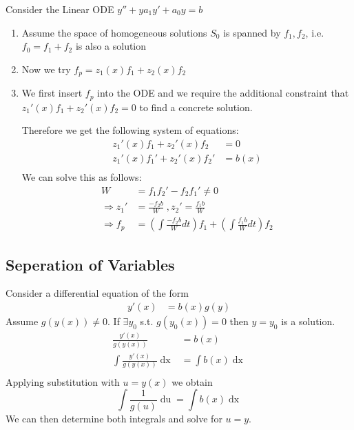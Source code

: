 \documentclass[a4paper,fontsize = 8pt]{scrartcl}
\begin{document}
Consider the Linear ODE $y'' + y a_1y' + a_0y = b$
\begin{enumerate}[label=(\arabic*)]
  \item Assume the space of homogeneous solutions $S_0$ is spanned by $f_1, f_2$, i.e. $f_0 = f_1 + f_2$ is also a solution  
  \item Now we try \(f_p = z_1(x) f_1 + z_2(x) f_2\)
  \item We first insert $f_p$ into the ODE and we require the additional constraint that $ z_1'(x) f_1 + z_2'(x) f_2 = 0$ to find a concrete solution. 
  
  Therefore we get the following system of equations:
  \begin{align*}
    z_1'(x) f_1 + z_2'(x) f_2 &= 0\\
    z_1'(x) f_1' + z_2'(x) f_2' &= b(x)\\
  \end{align*}
  We can solve this as follows:
  \begin{align*}
    W &= f_1 f_2' - f_2 f_1' \neq 0\\
    \Rightarrow z_1' &= \frac{-f_2 b}{W} \; , z_2' = \frac{f_1 b}{W}\\
    \Rightarrow f_p &= \left(\int \frac{-f_2 b}{W} dt\right)f_1  + \left(\int \frac{f_1 b}{W} dt\right)f_2 
  \end{align*}
\end{enumerate}

\subsection{Seperation of Variables}
    Consider a differential equation of the form 
    \begin{align*}
        y'(x) &= b(x)g(y)
    \end{align*}
    Assume $g(y(x)) \neq 0$. If $\exists y_0$ s.t. $g(y_0(x)) = 0$ then $y = y_0$ is a solution.
    \begin{align*}
        \frac{y'(x)}{g(y(x))} &= b(x)\\
        \int \frac{y'(x)}{g(y(x))} \mathop{dx} &= \int b(x) \mathop{dx}\\
    \end{align*}
    Applying substitution with $u = y(x)$ we obtain 
    $$\int \frac{1}{g(u)}\mathop{du} = \int b(x) \mathop{dx}$$
    We can then determine both integrals and solve for $u = y$.
\end{document}
